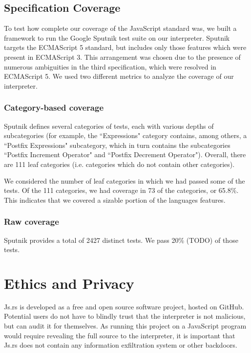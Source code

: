 \documentclass{article}
\begin{document}
\begin{multicols}{2}
\subsection{Specification Coverage}

To test how complete our coverage of the JavaScript standard was, we built a
framework to run the Google Sputnik test suite\cite{sputnik} on our interpreter.
Sputnik targets the ECMAScript 5 standard, but includes only those features
which were present in ECMAScript 3. This arrangement was chosen due to the
presence of numerous ambiguities in the third specification, which were resolved
in ECMAScript 5. We used two different metrics to analyze the coverage of our
interpreter.

\subsubsection*{Category-based coverage}

Sputnik defines several categories of tests, each with various depths of
subcategories (for example, the ``Expressions" category contains, among others,
a ``Postfix Expressions" subcategory, which in turn contains the subcategories
``Postfix Increment Operator" and ``Postfix Decrement Operator"). Overall, there
are 111 leaf categories (i.e. categories which do not contain other
categories). \newline

We considered the number of leaf categories in which we had passed some of the
tests. Of the 111 categories, we had coverage in 73 of the categories, or
65.8\%. This indicates that we covered a sizable portion of the languages
features.

\subsubsection*{Raw coverage}

Sputnik provides a total of 2427 distinct tests. We pass 20\% (TODO) of those
tests.

\section{Ethics and Privacy}

Js.rs is developed as a free and open source software project, hosted on GitHub.
Potential users do not have to blindly trust that the interpreter is not
malicious, but can audit it for themselves. As running this project on a
JavaScript program would require revealing the full source to the interpreter,
it is important that Js.rs does not contain any information exfiltration system
or other backdoors.


\end{multicols}
\end{document}
